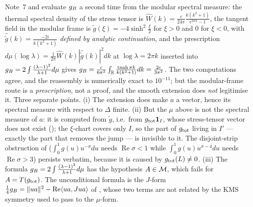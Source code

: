 \begin{remark}\label{rem:mellin}
Note~7 \cite{Note7} and \cite{RigorCol} evaluate $g_{B}$ a second time from the modular spectral measure:
the thermal spectral density of the stress tensor is
$\widehat W(k)=\frac{c}{24\pi}\frac{k(k^{2}+1)}{e^{2\pi k}-1}$, the tangent field in the modular frame is
$\tilde g(\xi)=-4\sinh^{2}\frac\xi2$ for $\xi>0$ and $0$ for $\xi<0$, with
$\hat{\tilde g}(k)=\frac{-2i}{k(k^{2}+1)}$ \emph{defined by analytic continuation}, and the prescription
$d\mu(\log\lambda)=\frac{1}{2\pi}\widehat W(k)|\hat{\tilde g}(k)|^{2}dk$ at $\log\lambda=2\pi k$ inserted
into $g_{B}=2\int\frac{(\lambda-1)^{2}}{\lambda+1}d\mu$ gives
$g_{B}=\frac{c}{6\pi^{2}}\int_{\mathbb R}\frac{\tanh\pi k}{k(k^{2}+1)}dk=\frac{2c}{3\pi^{2}}$.  The two
computations agree, and the reassembly is numerically exact to $10^{-11}$; but the modular-frame route is a
\emph{prescription}, not a proof, and the smooth extension does \emph{not} legitimise it.  Three separate
points.  (i) The extension does make $a$ a vector, hence its spectral measure with respect to $\Delta$
finite.  (ii) But the $\mu$ above is not the spectral measure of $a$: it is computed from $\tilde g$, i.e.\
from $g_{\rm tot}\mathbf 1_{I}$, whose stress-tensor vector does not exist (); the
$\xi$-chart covers only $I$, so the part of $g_{\rm tot}$ living in $I'$ --- exactly the part that removes
the jump --- is invisible to it.  The disjoint-strip obstruction of \cite{RigorCol}
($\int_{0}^{1}g(u)u^{-\sigma}du$ needs $\operatorname{Re}\sigma<1$ while
$\int_{0}^{1}g(u)u^{\sigma-4}du$ needs $\operatorname{Re}\sigma>3$) persists verbatim, because it is caused
by $g_{\rm tot}(L)\ne0$.  (iii) The formula $g_{B}=2\int\frac{(\lambda-1)^{2}}{\lambda+1}d\mu$ has the
hypothesis $A\in\mathcal M$, which fails for $A=T(g_{\rm tot})$.  The unconditional formula is the $J$-form
$\frac14g_{B}=\|ua\|^{2}-\operatorname{Re}\langle ua,Jua\rangle$ of \Cref{thm:three}, whose two terms are not
related by the KMS symmetry used to pass to the $\mu$-form.
\end{remark}

